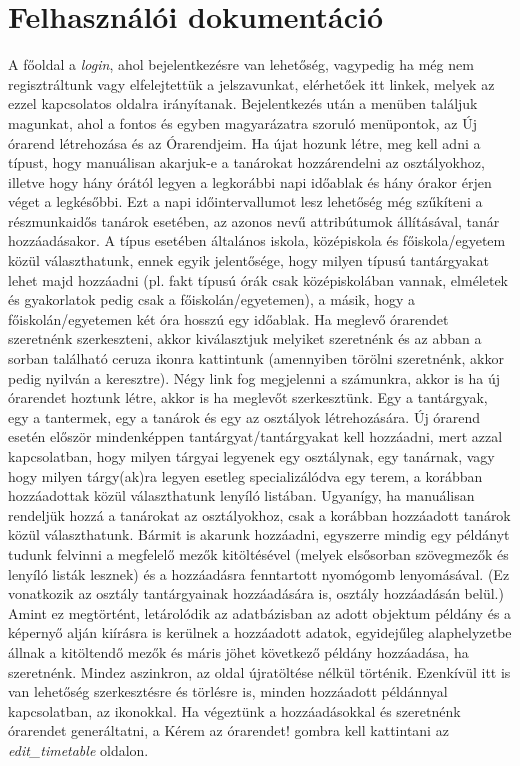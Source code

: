 \documentclass[12pt,a4paper]{report}
\begin{document}
\section{Felhasználói dokumentáció}

A főoldal a \textit{login}, ahol bejelentkezésre van lehetőség, vagypedig ha még nem regisztráltunk vagy elfelejtettük a jelszavunkat, elérhetőek itt linkek, melyek az ezzel kapcsolatos oldalra irányítanak. Bejelentkezés után a menüben találjuk magunkat, ahol a fontos és egyben magyarázatra szoruló menüpontok, az Új órarend létrehozása és az Órarendjeim. Ha újat hozunk létre, meg kell adni a típust, hogy manuálisan akarjuk-e a tanárokat hozzárendelni az osztályokhoz, illetve hogy hány órától legyen a legkorábbi napi időablak és hány órakor érjen véget a legkésőbbi. Ezt a napi időintervallumot lesz lehetőség még szűkíteni a részmunkaidős tanárok esetében, az azonos nevű attribútumok állításával, tanár hozzáadásakor. A típus esetében általános iskola, középiskola és főiskola/egyetem közül választhatunk, ennek egyik jelentősége, hogy milyen típusú tantárgyakat lehet majd hozzáadni (pl. fakt típusú órák csak középiskolában vannak, elméletek és gyakorlatok pedig csak a főiskolán/egyetemen), a másik, hogy a főiskolán/egyetemen két óra hosszú egy időablak. Ha meglevő órarendet szeretnénk szerkeszteni, akkor kiválasztjuk melyiket szeretnénk és az abban a sorban található ceruza ikonra kattintunk (amennyiben törölni szeretnénk, akkor pedig nyilván a keresztre). Négy link fog megjelenni a számunkra, akkor is ha új órarendet hoztunk létre, akkor is ha meglevőt szerkesztünk. Egy a tantárgyak, egy a tantermek, egy a tanárok és egy az osztályok létrehozására. Új órarend esetén először mindenképpen tantárgyat/tantárgyakat kell hozzáadni, mert azzal kapcsolatban, hogy milyen tárgyai legyenek egy osztálynak, egy tanárnak, vagy hogy milyen tárgy(ak)ra legyen esetleg specializálódva egy terem, a korábban hozzáadottak közül választhatunk lenyíló listában. Ugyanígy, ha manuálisan rendeljük hozzá a tanárokat az osztályokhoz, csak a korábban hozzáadott tanárok közül választhatunk. Bármit is akarunk hozzáadni, egyszerre mindig egy példányt tudunk felvinni a megfelelő mezők kitöltésével (melyek elsősorban szövegmezők és lenyíló listák lesznek) és a hozzáadásra fenntartott nyomógomb lenyomásával. (Ez vonatkozik az osztály tantárgyainak hozzáadására is, osztály hozzáadásán belül.) Amint ez megtörtént, letárolódik az adatbázisban az adott objektum példány és a képernyő alján kiírásra is kerülnek a hozzáadott adatok, egyidejűleg alaphelyzetbe állnak a kitöltendő mezők és máris jöhet következő példány hozzáadása, ha szeretnénk. Mindez aszinkron, az oldal újratöltése nélkül történik. Ezenkívül itt is van lehetőség szerkesztésre és törlésre is, minden hozzáadott példánnyal kapcsolatban, az ikonokkal. Ha végeztünk a hozzáadásokkal és szeretnénk órarendet generáltatni, a Kérem az órarendet! gombra kell kattintani az \textit{edit\_timetable} oldalon.
\end{document}
